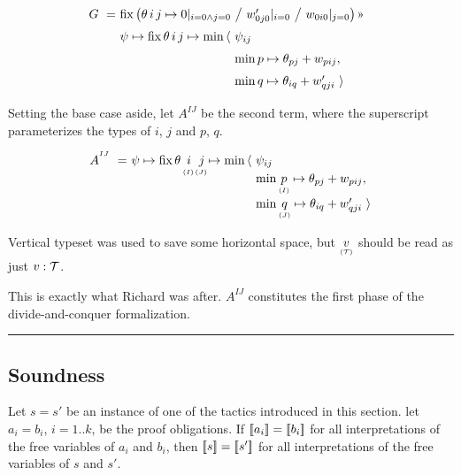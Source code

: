 \begin{equation}
  \renewcommand\arraystretch{1.5}
  \begin{array}{@{}l@{}l@{}l@{}}
    G ~=~ & \lspan2{\fix \big(\theta\,i\,j\mapsto
	              0|_{i=0\land j=0} ~\big/~ w'_{0j0}|_{i=0} ~\big/~ w_{0i0}|_{j=0}\big)\applt} \\
	      & \psi\mapsto \fix \theta\,i\,j\mapsto\min\,\langle~ & \psi_{ij} \\
	      & & \min p\mapsto\theta_{pj}+w_{pij}, \\
	      & & \min q\mapsto\theta_{iq}+w'_{qji} ~\rangle
  \end{array}
\end{equation}

Setting the base case aside, let $A^{IJ}$ be the second term,
where the superscript parameterizes the types of $i$, $j$ and $p$, $q$.

\newcommand\vtyped[2]{\underset{\scriptscriptstyle ( #2 )}{ #1 }}

\begin{equation}
  \renewcommand\arraystretch{1.2}
  \begin{array}{@{}l@{}l@{}c@{}c@{}l@{}l@{}}
    A^{^{IJ}} ~=~ 
	      & \psi\mapsto \fix \theta\,& i & j & \mapsto\min\,\langle~ & \psi_{ij} \\
	      & & ^{^{(I)}} & ^{^{(J)}} & & \min \vtyped p I \mapsto\theta_{pj}+w_{pij}, \\
	      & & & & & \min \vtyped q J \mapsto\theta_{iq}+w'_{qji} ~\rangle
  \end{array}
  \label{tactics:arbiter phase A}
\end{equation}

Vertical typeset was used to save some horizontal space, but $\vtyped v\T$
should be read as just $v:\mathcal{T}$.

\medskip
This is exactly what Richard was after. $A^{IJ}$ constitutes the first phase
of the divide-and-conquer formalization.

\medskip
\hrule
\bigskip

\subsection{Soundness}

\renewenvironment{proof}{\noindent{\bf Proof.~}}{}

\begin{theorem}
Let $s=s'$ be an instance of one of the tactics introduced in this section.
let $a_i=b_i$, $i=1..k$, be the proof obligations. If $[\![{a_i}]\!]=[\![{b_i}]\!]$
for all interpretations of the free variables of $a_i$ and $b_i$, then
$[\![{s}]\!]=[\![{s'}]\!]$ for all interpretations of the free variables of $s$ and $s'$.
\end{theorem}

